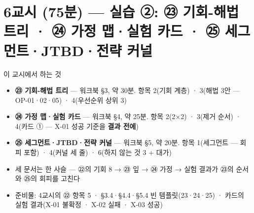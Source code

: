 \section{6교시 (75분) — 실습 ②: ㉓ 기회-해법 트리 · ㉔ 가정 맵·실험 카드 · ㉕ 세그먼트·JTBD·전략 커널}
\begin{frame}{이 교시에서 하는 것}
\begin{itemize}
\item \textbf{㉓ 기회-해법 트리} — 워크북 §3, 약 30분. 항목 2(기회 계층) · 3(해법 3안 — OP-01·02·05) · 4(우선순위 상위 3)
\item \textbf{㉔ 가정 맵·실험 카드} — 워크북 §4, 약 25분. 항목 2(2×2) · 3(제거 순서) · 4(카드 ① — X-01 성공 기준을 \textbf{결과 전에})
\item \textbf{㉕ 세그먼트·JTBD·전략 커널} — 워크북 §5, 약 20분. 항목 1(세그먼트 — 회피 포함) · 4(커널 세 줄) · 6(하지 않는 것 3 + 대가)
\item 세 문서는 한 사슬 — ㉒의 기회 8 → ㉓ 잎 → ㉔ 가정 → 실험 결과가 ㉓의 순서와 ㉕의 회피를 고친다
\item 준비물: 4교시의 ㉒ 항목 5 · §3.4·§4.4·§5.4 빈 템플릿(23·24·25) · 카드의 실험 결과(X-01 불확정 · X-02 실패 · X-03 성공)
\end{itemize}
\end{frame}

